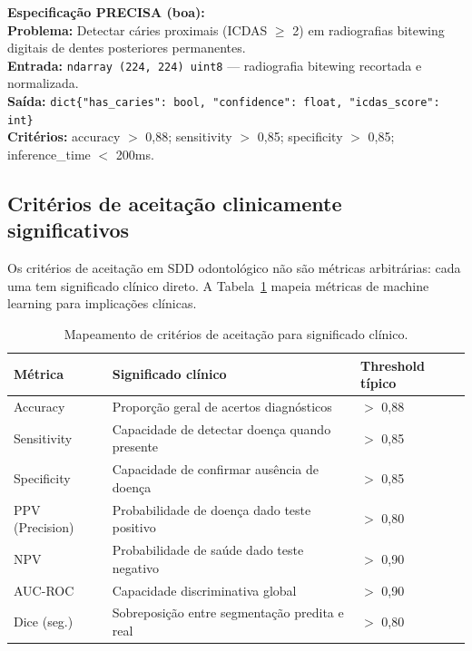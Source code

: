 \begin{mdframed}[linecolor=corTesteSucesso, linewidth=2pt, backgroundcolor=corTesteSucesso!5]
  \textbf{Especificação PRECISA (boa):} \\
  \textbf{Problema:} Detectar cáries proximais (ICDAS $\geq$ 2) em radiografias
  bitewing digitais de dentes posteriores permanentes. \\
  \textbf{Entrada:} \texttt{ndarray (224, 224) uint8} — radiografia bitewing
  recortada e normalizada. \\
  \textbf{Saída:} \texttt{dict\{"has\_caries": bool, "confidence": float, "icdas\_score": int\}} \\
  \textbf{Critérios:} accuracy $>$ 0,88; sensitivity $>$ 0,85; specificity $>$ 0,85;
  inference\_time $<$ 200ms.
\end{mdframed}


\subsection{Critérios de aceitação clinicamente significativos}

Os critérios de aceitação em SDD odontológico não são métricas arbitrárias:
cada uma tem significado clínico direto. A Tabela~\ref{tab:criterios-clinicos}
mapeia métricas de machine learning para implicações clínicas.

\begin{table}[H]
  \centering
  \caption{Mapeamento de critérios de aceitação para significado clínico.}
  \label{tab:criterios-clinicos}
  \begin{tabularx}{\textwidth}{lXl}
    \toprule
    \textbf{Métrica} & \textbf{Significado clínico} & \textbf{Threshold típico} \\
    \midrule
    Accuracy & Proporção geral de acertos diagnósticos & $>$ 0,88 \\
    Sensitivity & Capacidade de detectar doença quando presente & $>$ 0,85 \\
    Specificity & Capacidade de confirmar ausência de doença & $>$ 0,85 \\
    PPV (Precision) & Probabilidade de doença dado teste positivo & $>$ 0,80 \\
    NPV & Probabilidade de saúde dado teste negativo & $>$ 0,90 \\
    AUC-ROC & Capacidade discriminativa global & $>$ 0,90 \\
    Dice (seg.) & Sobreposição entre segmentação predita e real & $>$ 0,80 \\
    \bottomrule
  \end{tabularx}
\end{table}

